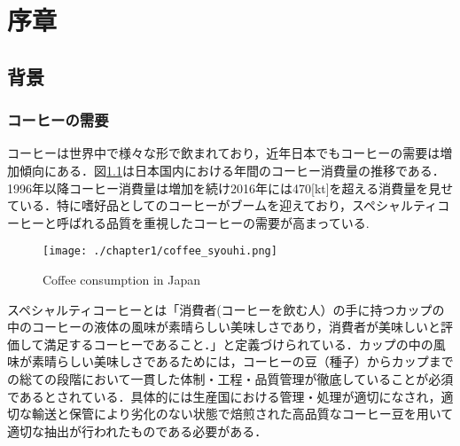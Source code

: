 
\chapter{序章}

\setcounter{page}{1}


\section{背景}

\subsection{コーヒーの需要}
コーヒーは世界中で様々な形で飲まれており，近年日本でもコーヒーの需要は増加傾向にある．図\ref{fig_syouhi}は日本国内における年間のコーヒー消費量の推移である．1996年以降コーヒー消費量は増加を続け2016年には470[kt]を超える消費量を見せている．特に嗜好品としてのコーヒーがブームを迎えており，スペシャルティコーヒーと呼ばれる品質を重視したコーヒーの需要が高まっている.
\begin{figure}[htbp]
  \begin{center}
    \texttt{[image: ./chapter1/coffee\_syouhi.png]}
    \caption{Coffee consumption in Japan}
    \label{fig_syouhi}
  \end{center}
\end{figure}

スペシャルティコーヒーとは「消費者(コーヒーを飲む人）の手に持つカップの中のコーヒーの液体の風味が素晴らしい美味しさであり，消費者が美味しいと評価して満足するコーヒーであること．」と定義づけられている．カップの中の風味が素晴らしい美味しさであるためには，コーヒーの豆（種子）からカップまでの総ての段階において一貫した体制・工程・品質管理が徹底していることが必須であるとされている．具体的には生産国における管理・処理が適切になされ，適切な輸送と保管により劣化のない状態で焙煎された高品質なコーヒー豆を用いて適切な抽出が行われたものである必要がある．

